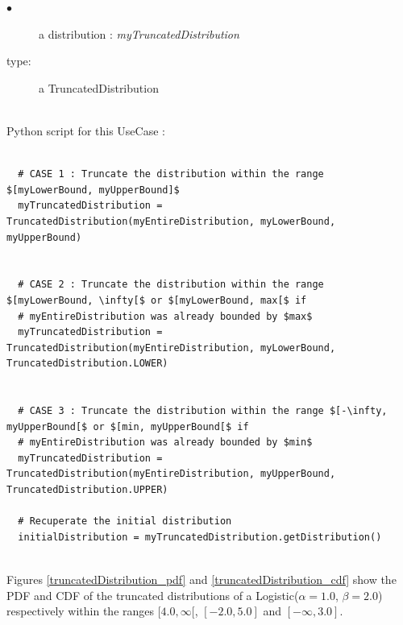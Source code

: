 \noindent%
{
  \begin{description}
  \item[$\bullet$] a distribution : {\itshape myTruncatedDistribution}
  \item[type:]  a TruncatedDistribution
  \end{description}
}

\textspace\\
Python script for this UseCase :

\begin{lstlisting}

  # CASE 1 : Truncate the distribution within the range $[myLowerBound, myUpperBound]$
  myTruncatedDistribution = TruncatedDistribution(myEntireDistribution, myLowerBound, myUpperBound)


  # CASE 2 : Truncate the distribution within the range $[myLowerBound, \infty[$ or $[myLowerBound, max[$ if
  # myEntireDistribution was already bounded by $max$
  myTruncatedDistribution = TruncatedDistribution(myEntireDistribution, myLowerBound, TruncatedDistribution.LOWER)


  # CASE 3 : Truncate the distribution within the range $[-\infty, myUpperBound[$ or $[min, myUpperBound[$ if
  # myEntireDistribution was already bounded by $min$
  myTruncatedDistribution = TruncatedDistribution(myEntireDistribution, myUpperBound, TruncatedDistribution.UPPER)

  # Recuperate the initial distribution
  initialDistribution = myTruncatedDistribution.getDistribution()
\end{lstlisting}

\textspace\\

Figures \ref{truncatedDistribution_pdf} and \ref{truncatedDistribution_cdf} show the PDF and CDF of the truncated distributions of a Logistic($\alpha = 1.0$, $\beta  =2.0$) respectively within the ranges $[4.0, \infty[$,  $[-2.0, 5.0]$ and $[-\infty, 3.0]$.

